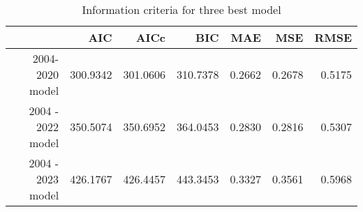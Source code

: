 \begin{table}[ht]
\centering
\begin{tabular}{rrrrrrr}
  \hline
 & AIC & AICc & BIC & MAE & MSE & RMSE \\ 
  \hline
2004-2020 model & 300.9342 & 301.0606 & 310.7378 & 0.2662 & 0.2678 & 0.5175 \\ 
  2004 - 2022 model & 350.5074 & 350.6952 & 364.0453 & 0.2830 & 0.2816 & 0.5307 \\ 
  2004 - 2023 model & 426.1767 & 426.4457 & 443.3453 & 0.3327 & 0.3561 & 0.5968 \\ 
   \hline
\end{tabular}
\caption{Information criteria for three best model} 
\end{table}
